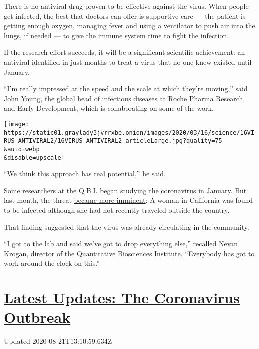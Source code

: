 There is no antiviral drug proven to be effective against the virus.
When people get infected, the best that doctors can offer is supportive
care --- the patient is getting enough oxygen, managing fever and using
a ventilator to push air into the lungs, if needed --- to give the
immune system time to fight the infection.

If the research effort succeeds, it will be a significant scientific
achievement: an antiviral identified in just months to treat a virus
that no one knew existed until January.

``I'm really impressed at the speed and the scale at which they're
moving,'' said John Young, the global head of infectious diseases at
Roche Pharma Research and Early Development, which is collaborating on
some of the work.

\texttt{[image: https://static01.graylady3jvrrxbe.onion/images/2020/03/16/science/16VIRUS-ANTIVIRAL2/16VIRUS-ANTIVIRAL2-articleLarge.jpg?quality=75\\\&auto=webp\\\&disable=upscale]}

``We think this approach has real potential,'' he said.

Some researchers at the Q.B.I. began studying the coronavirus in
January. But last month, the threat
\href{https://www.nytimes3xbfgragh.onion/2020/02/26/health/coronavirus-cdc-usa.html}{became
more imminent}: A woman in California was found to be infected although
she had not recently traveled outside the country.

That finding suggested that the virus was already circulating in the
community.

``I got to the lab and said we've got to drop everything else,''
recalled Nevan Krogan, director of the Quantitative Biosciences
Institute. ``Everybody has got to work around the clock on this.''

\hypertarget{latest-updates-the-coronavirus-outbreak}{%
\section{\texorpdfstring{\href{https://www.nytimes3xbfgragh.onion/2020/08/21/world/covid-19-coronavirus.html?action=click\&pgtype=Article\&state=default\&region=MAIN_CONTENT_1\&context=storylines_live_updates}{Latest
Updates: The Coronavirus
Outbreak}}{Latest Updates: The Coronavirus Outbreak}}\label{latest-updates-the-coronavirus-outbreak}}

Updated 2020-08-21T13:10:59.634Z

